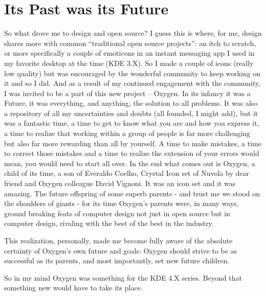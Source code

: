 \section*{Its Past was its Future}
So what drove me to design and open source? 
I guess this is where, for me, design shares more with common “traditional open source projects”: an itch to scratch, or more specifically a couple of emoticons in an instant messaging app I used in my favorite desktop at the time (KDE 3.X). So I made a couple of icons (really low quality) but was encouraged by the wonderful community to keep working on it and so I did. And as a result of my continued engagement with the community, I was invited to be a part of this new project – Oxygen. In its infancy it was a Future, it was everything, and anything, the solution to all problems. It was also a repository of all my uncertainties and doubts (all founded, I might add), but it was a fantastic time, a time to get to know what you are and how you express it, a time to realize that working within a group of people is far more challenging but also far more rewarding than all by yourself. A time to make mistakes, a time to correct those mistakes and a time to realize the extension of your errors would mean, you would need to start all over.
In the end what comes out is Oxygen, a child of its time, a son of Everaldo Coelho, Crystal Icon set of Nuvola by dear friend and Oxygen colleague David Vignoni. It was an icon set and it was amazing.
The future offspring of some superb parents - and trust me we stood on the shoulders of giants - for its time Oxygen's parents were, in many ways, ground breaking feats of computer design not just in open source but in computer design, rivaling with the best of the best in the industry.

This realization, personally, made me become fully aware of the absolute certainty of Oxygen's own future and goals: Oxygen should strive to be as successful as its parents, and most importantly, set new future children.

So in my mind Oxygen was something for the KDE 4.X series. Beyond that something new would have to take its place.  


